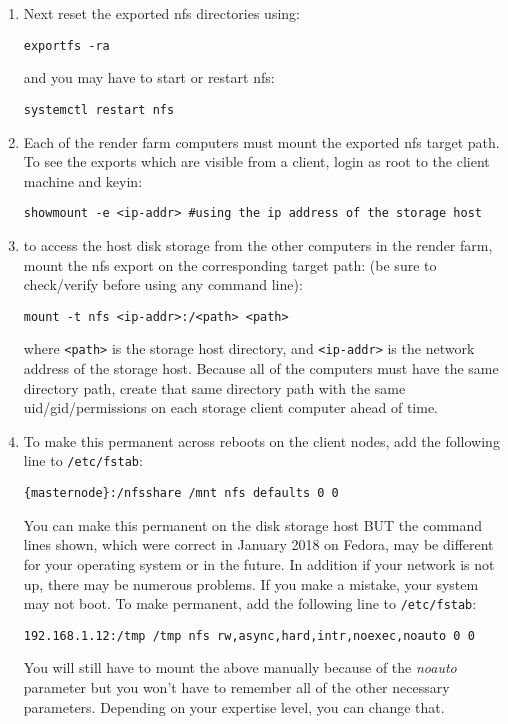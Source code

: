 \begin{description}
\begin{enumerate}
  \item Next reset the exported nfs directories using:
\begin{lstlisting}[style=sh]
exportfs -ra
\end{lstlisting} and you may have to start or restart nfs:
\begin{lstlisting}[style=sh]
systemctl restart nfs
\end{lstlisting}
  \item Each of the render farm computers must mount the exported
    nfs target path.  To see the exports which are visible from a
    client, login as root to the client machine and keyin:
\begin{lstlisting}[style=sh]
showmount -e <ip-addr> #using the ip address of the storage host
\end{lstlisting}
  \item to access the host disk storage from the other computers in
    the render farm, mount the nfs export on the corresponding target
    path: (be sure to check/verify before using any command line):
\begin{lstlisting}[style=sh]
mount -t nfs <ip-addr>:/<path> <path>
\end{lstlisting} where \texttt{<path>} is the storage host
    directory, and \texttt{<ip-addr>} is the network address of the
    storage host.  Because all of the computers must have the same
    directory path, create that same directory path with the same
    uid/gid/permissions on each storage client computer ahead of time.
  \item To make this permanent across reboots on the client nodes,
    add the following line to \texttt{/etc/fstab}:
\begin{lstlisting}[style=sh]
{masternode}:/nfsshare /mnt nfs defaults 0 0
\end{lstlisting} You can make this permanent on the disk storage
    host BUT the command lines shown, which were correct in January 2018
    on Fedora, may be different for your operating system or in the
    future.  In addition if your network is not up, there may be
    numerous problems.  If you make a mistake, your system may not boot.
    To make permanent, add the following line to \texttt{/etc/fstab}:
\begin{lstlisting}[style=sh]
192.168.1.12:/tmp /tmp nfs rw,async,hard,intr,noexec,noauto 0 0
\end{lstlisting} You will still have to mount the above manually
    because of the \textit{noauto} parameter but you won’t have to
    remember all of the other necessary parameters.  Depending on your
    expertise level, you can change that.


\end{enumerate}
\end{description}
